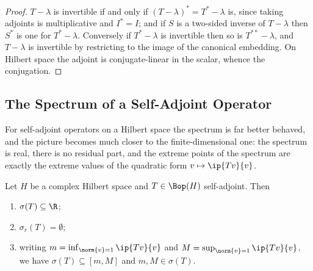 \begin{proof}
	$T - \lambda$ is invertible if and only if $(T-\lambda)^* = T^*-\lambda$ is, since taking adjoints is multiplicative and $I^*=I$; and if $S$ is a two-sided inverse of $T-\lambda$ then $S^*$ is one for $T^*-\lambda$. Conversely if $T^*-\lambda$ is invertible then so is $T^{**}-\lambda$, and $T-\lambda$ is invertible by restricting to the image of the canonical embedding. On Hilbert space the adjoint is conjugate-linear in the scalar, whence the conjugation.
\end{proof}

\subsection{The Spectrum of a Self-Adjoint Operator}

For self-adjoint operators on a Hilbert space the spectrum is far better behaved, and the picture becomes much closer to the finite-dimensional one: the spectrum is real, there is no residual part, and the extreme points of the spectrum are exactly the extreme values of the quadratic form $v \mapsto \ip{Tv}{v}$.

\begin{proposition}
	Let $H$ be a complex Hilbert space and $T\in\Bop(H)$ self-adjoint. Then
	\begin{enumerate}[label=(\roman*)]
		\item $\sigma(T)\subseteq\R$;
		\item $\sigma_r(T)=\emptyset$;
		\item writing $m = \inf_{\norm{v}=1}\ip{Tv}{v}$ and $M = \sup_{\norm{v}=1}\ip{Tv}{v}$, we have $\sigma(T)\subseteq[m,M]$ and $m, M\in\sigma(T)$.
	\end{enumerate}
\end{proposition}

